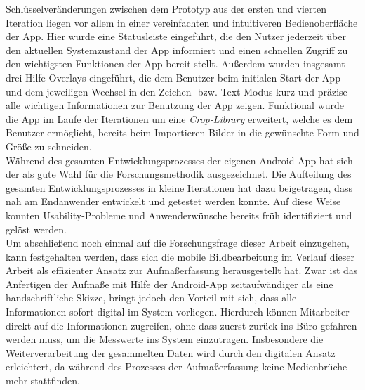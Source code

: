 Schlüsselveränderungen zwischen dem Prototyp aus der ersten und vierten Iteration liegen vor allem in einer vereinfachten und intuitiveren Bedienoberfläche der App.
Hier wurde eine Statusleiste eingeführt, die den Nutzer jederzeit über den aktuellen Systemzustand der App informiert und einen schnellen Zugriff zu den wichtigsten Funktionen der App bereit stellt.
Außerdem wurden insgesamt drei Hilfe-Overlays eingeführt, die dem Benutzer beim initialen Start der App und dem jeweiligen Wechsel in den Zeichen- bzw. Text-Modus kurz und präzise alle wichtigen Informationen zur Benutzung der App zeigen.
Funktional wurde die App im Laufe der Iterationen um eine \emph{Crop-Library} erweitert, welche es dem Benutzer ermöglicht, bereits beim Importieren Bilder in die gewünschte Form und Größe zu schneiden. \\

Während des gesamten Entwicklungsprozesses der eigenen Android-App hat sich der \hcdp{} als gute Wahl für die Forschungsmethodik ausgezeichnet.
Die Aufteilung des gesamten Entwicklungsprozesses in kleine Iterationen hat dazu beigetragen, dass nah am Endanwender entwickelt und getestet werden konnte.
Auf diese Weise konnten Usability-Probleme und Anwenderwünsche bereits früh identifiziert und gelöst werden. \\

Um abschließend noch einmal auf die Forschungsfrage dieser Arbeit einzugehen, kann festgehalten werden, dass sich die mobile Bildbearbeitung im Verlauf dieser Arbeit als effizienter Ansatz zur Aufmaßerfassung herausgestellt hat.
Zwar ist das Anfertigen der Aufmaße mit Hilfe der Android-App zeitaufwändiger als eine handschriftliche Skizze, bringt jedoch den Vorteil mit sich, dass alle Informationen sofort digital im System vorliegen.
Hierdurch können Mitarbeiter direkt auf die Informationen zugreifen, ohne dass zuerst zurück ins Büro gefahren werden muss, um die Messwerte ins System einzutragen.
Insbesondere die Weiterverarbeitung der gesammelten Daten wird durch den digitalen Ansatz erleichtert, da während des Prozesses der Aufmaßerfassung keine Medienbrüche mehr stattfinden. 

